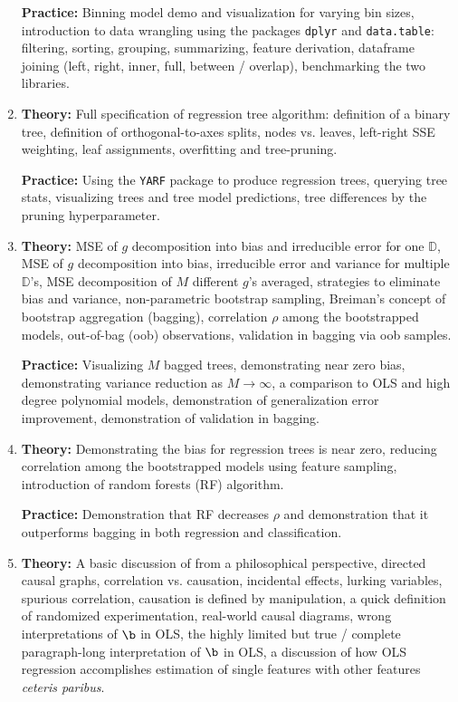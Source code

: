 \begin{enumerate}[(1)]
\textbf{Practice:} Binning model demo and visualization for varying bin sizes, introduction to data wrangling using the packages \texttt{dplyr} and \texttt{data.table}: filtering, sorting, grouping, summarizing, feature derivation, dataframe joining (left, right, inner, full, between / overlap), benchmarking the two libraries.

\item \textbf{Theory:} Full specification of regression tree algorithm: definition of a binary tree, definition of orthogonal-to-axes splits, nodes vs. leaves, left-right SSE weighting, leaf assignments, overfitting and tree-pruning.

\textbf{Practice:} Using the \texttt{YARF} package to produce regression trees, querying tree stats, visualizing trees and tree model predictions, tree differences by the pruning hyperparameter.

\item \textbf{Theory:} MSE of $g$ decomposition into bias and irreducible error for one $\mathbb{D}$, MSE of $g$ decomposition into bias, irreducible error and variance for multiple $\mathbb{D}$'s, MSE decomposition of $M$ different $g$'s averaged, strategies to eliminate bias and variance, non-parametric bootstrap sampling, Breiman's concept of bootstrap aggregation (bagging), correlation $\rho$ among the bootstrapped models, out-of-bag (oob) observations, validation in bagging via oob samples.

\textbf{Practice:} Visualizing $M$ bagged trees, demonstrating near zero bias, demonstrating variance reduction as $M \rightarrow \infty$, a comparison to OLS and high degree polynomial models, demonstration of generalization error improvement, demonstration of validation in bagging.

\item \textbf{Theory:} Demonstrating the bias for regression trees is near zero, reducing correlation among the bootstrapped models using feature sampling, introduction of random forests (RF) algorithm.

\textbf{Practice:} Demonstration that RF decreases $\rho$ and demonstration that it outperforms bagging in both regression and classification.

\item \textbf{Theory:} A basic discussion of  from a philosophical perspective, directed causal graphs, correlation vs. causation, incidental effects, lurking variables, spurious correlation, causation is defined by manipulation, a quick definition of randomized experimentation, real-world causal diagrams, wrong interpretations of $\b$ in OLS, the highly limited but true / complete paragraph-long interpretation of $\b$ in OLS, a discussion of how OLS regression accomplishes estimation of single features with other features \emph{ceteris paribus}.


\end{enumerate}
